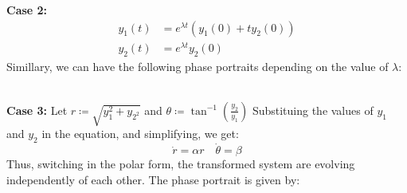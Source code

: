 % 
% 
\medskip
\textbf{Case 2:}
\[
    \begin{aligned}
        y_1(t) &= e^{\lambda t} \left(   y_1(0) + t y_2(0)  \right)\\
        y_2(t) &= e^{\lambda t} y_2(0)
    \end{aligned}
\]
Simillary, we can have the following phase portraits depending on the value of \(\lambda\):\\
\medskip%
\begin{minipage}
    {0.5\textwidth}
    
\end{minipage}
\begin{minipage}
    {0.5\textwidth}
    
\end{minipage}\\
\medskip%
\textbf{Case 3:} Let \( r\coloneqq \sqrt{y_1 ^{2} + y_{2^{2} }  } \) and \(\theta \coloneqq \tan ^{-1}  \left( \frac{y_2}{y_1}  \right) \)
Substituing the values of \(y_1\) and \(y_2\) in the equation, and simplifying, we get:
\[
    \dot{r} = \alpha r \quad \dot{\theta} = \beta 
\]
Thus, switching in the polar form, the transformed system are evolving independently of each other.
The phase portrait is given by:\\
\medskip%
\begin{minipage}
    {0.5\textwidth}
    
\end{minipage}
\begin{minipage}
    {0.5\textwidth}
    
\end{minipage}\\
% 